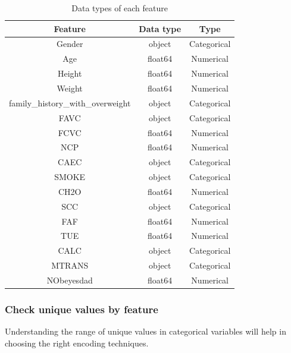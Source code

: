 \documentclass[11pt, a4paper]{article}
\begin{document}
\begin{table}[H]
    \centering
    \begin{tabular}{|c|c|c|}
        \hline
        \textbf{Feature} & \textbf{Data type} & \textbf{Type} \\ \hline
        Gender & object & Categorical \\ \hline
        Age & float64 & Numerical \\ \hline
        Height & float64 & Numerical \\ \hline
        Weight & float64 & Numerical \\ \hline
        family\_history\_with\_overweight & object & Categorical \\ \hline
        FAVC & object & Categorical \\ \hline
        FCVC & float64 & Numerical \\ \hline
        NCP & float64 & Numerical \\ \hline
        CAEC & object & Categorical \\ \hline
        SMOKE & object & Categorical \\ \hline
        CH2O & float64 & Numerical \\ \hline
        SCC & object & Categorical \\ \hline
        FAF & float64 & Numerical \\ \hline
        TUE & float64 & Numerical \\ \hline
        CALC & object & Categorical \\ \hline
        MTRANS & object & Categorical \\ \hline
        NObeyesdad & float64 & Numerical \\ \hline
    \end{tabular}
    \caption{Data types of each feature}
    \label{tab:table_data_types}
\end{table}

\subsubsection{Check unique values by feature}

Understanding the range of unique values in categorical variables will help in choosing the right encoding techniques.
\end{document}
